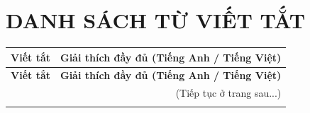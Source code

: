 \section*{DANH SÁCH TỪ VIẾT TẮT}
 {}

\begin{longtable}{@{} p{} p{} @{}}
\toprule
\textbf{Viết tắt} & \textbf{Giải thích đầy đủ (Tiếng Anh / Tiếng Việt)} \\
\midrule
\endfirsthead

\toprule
\textbf{Viết tắt} & \textbf{Giải thích đầy đủ (Tiếng Anh / Tiếng Việt)} \\
\midrule
\endhead

\midrule
\multicolumn{2}{r}{{(Tiếp tục ở trang sau...)}} \\
\bottomrule
\endfoot

\bottomrule
\endlastfoot


\end{longtable}
